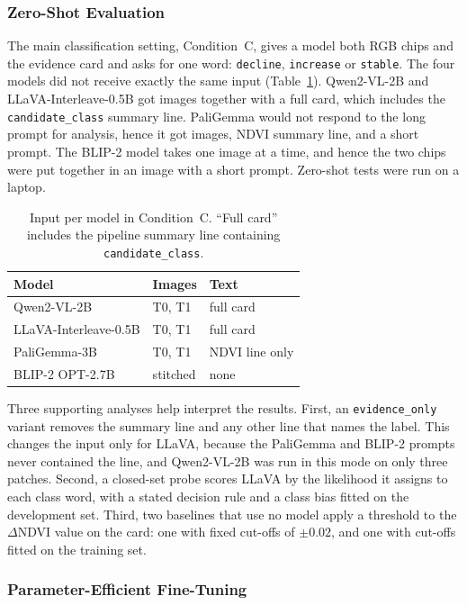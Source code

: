 \documentclass[11pt]{article}
\begin{document}
\subsubsection{Zero-Shot Evaluation}

The main classification setting, Condition~C, gives a model both RGB
chips and the evidence card and asks for one word: \texttt{decline},
\texttt{increase} or \texttt{stable}. The four models did not receive
exactly the same input (Table~\ref{tab:inputs}). Qwen2-VL-2B and
LLaVA-Interleave-0.5B got images together with a full card, which includes
the \texttt{candidate\_class} summary line. PaliGemma would not respond
to the long prompt for analysis, hence it got images, NDVI summary line,
and a short prompt. The BLIP-2 model takes one image at a time, and hence
the two chips were put together in an image with a short prompt. Zero-shot
tests were run on a laptop.

\begin{table}[t]
\centering
\small
\begin{tabular}{lll}
\toprule
Model & Images & Text \\
\midrule
Qwen2-VL-2B & T0, T1 & full card \\
LLaVA-Interleave-0.5B & T0, T1 & full card \\
PaliGemma-3B & T0, T1 & NDVI line only \\
BLIP-2 OPT-2.7B & stitched & none \\
\bottomrule
\end{tabular}
\caption{Input per model in Condition~C. ``Full card'' includes the
pipeline summary line containing \texttt{candidate\_class}.}
\label{tab:inputs}
\end{table}

Three supporting analyses help interpret the results. First, an
\texttt{evidence\_only} variant removes the summary line and any other
line that names the label. This changes the input only for LLaVA,
because the PaliGemma and BLIP-2 prompts never contained the line, and
Qwen2-VL-2B was run in this mode on only three patches. Second, a
closed-set probe scores LLaVA by the likelihood it assigns to each class
word, with a stated decision rule and a class bias fitted on the
development set. Third, two baselines that use no model apply a
threshold to the $\Delta$NDVI value on the card: one with fixed cut-offs
of $\pm 0.02$, and one with cut-offs fitted on the training set.

\subsubsection{Parameter-Efficient Fine-Tuning}
\end{document}
